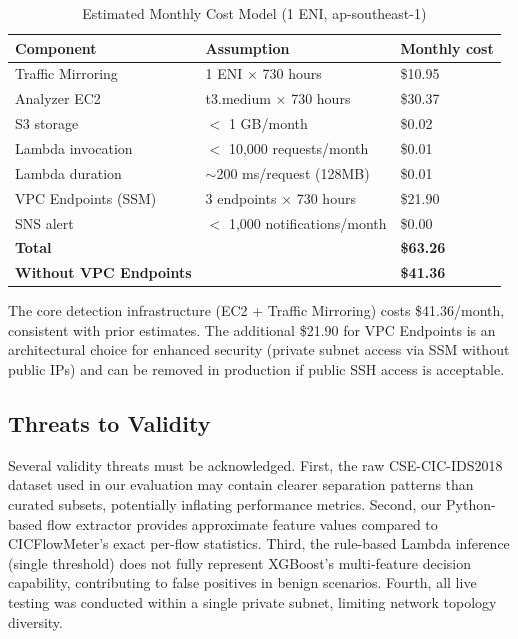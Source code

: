 \documentclass[conference]{IEEEtran}
\begin{document}
\begin{table}[!ht]
\centering
\caption{Estimated Monthly Cost Model (1 ENI, ap-southeast-1)}
\footnotesize
\setlength{\tabcolsep}{3pt}
\begin{tabulary}{\linewidth}{|l|L|L|}
\hline
\textbf{Component} & \textbf{Assumption} & \textbf{Monthly cost} \\
\hline
Traffic Mirroring & 1 ENI $\times$ 730 hours & \$10.95 \\
Analyzer EC2 & t3.medium $\times$ 730 hours & \$30.37 \\
S3 storage & $<$ 1 GB/month & \$0.02 \\
Lambda invocation & $<$ 10,000 requests/month & \$0.01 \\
Lambda duration & $\sim$200 ms/request (128MB) & \$0.01 \\
VPC Endpoints (SSM) & 3 endpoints $\times$ 730 hours & \$21.90 \\
SNS alert & $<$ 1,000 notifications/month & \$0.00 \\
\textbf{Total} &  & \textbf{\$63.26} \\
\textbf{Without VPC Endpoints} & & \textbf{\$41.36} \\
\hline
\end{tabulary}
\end{table}

The core detection infrastructure (EC2 + Traffic Mirroring) costs \$41.36/month, consistent with prior estimates. The additional \$21.90 for VPC Endpoints is an architectural choice for enhanced security (private subnet access via SSM without public IPs) and can be removed in production if public SSH access is acceptable.

\subsection{Threats to Validity}

Several validity threats must be acknowledged. First, the raw CSE-CIC-IDS2018 dataset used in our evaluation may contain clearer separation patterns than curated subsets, potentially inflating performance metrics. Second, our Python-based flow extractor provides approximate feature values compared to CICFlowMeter's exact per-flow statistics. Third, the rule-based Lambda inference (single threshold) does not fully represent XGBoost's multi-feature decision capability, contributing to false positives in benign scenarios. Fourth, all live testing was conducted within a single private subnet, limiting network topology diversity.
\end{document}
